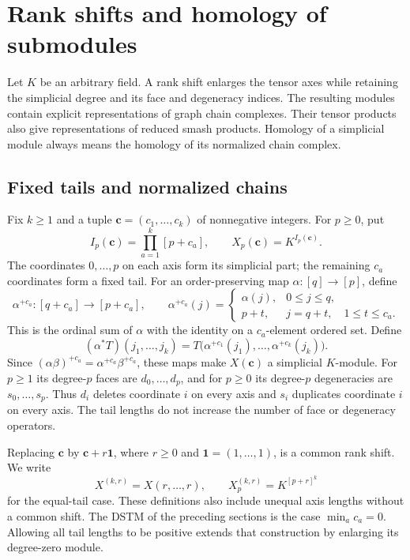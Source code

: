 \section{Rank shifts and homology of submodules}
\label{sec:rank-shifted-homology}

Let $K$ be an arbitrary field. A rank shift enlarges the tensor axes while retaining
the simplicial degree and its face and degeneracy indices. The resulting
modules contain explicit representations of graph chain complexes. Their
tensor products also give representations of reduced smash products.
Homology of a simplicial module always means the homology of its
normalized chain complex.

\subsection{Fixed tails and normalized chains}

Fix $k\geq 1$ and a tuple $\mathbf c=(c_1,\ldots,c_k)$ of nonnegative
integers. For $p\geq 0$, put
\[
 I_p(\mathbf c)=\prod_{a=1}^k[p+c_a],
 \qquad X_p(\mathbf c)=K^{I_p(\mathbf c)}.
\]
The coordinates $0,\ldots,p$ on each axis form its simplicial part; the
remaining $c_a$ coordinates form a fixed tail. For an order-preserving map
$\alpha:[q]\to[p]$, define
\[
 \alpha^{+c_a}:[q+c_a]\longrightarrow[p+c_a],\qquad
 \alpha^{+c_a}(j)=
 \begin{cases}
   \alpha(j),&0\leq j\leq q,\\
   p+t,&j=q+t,\quad 1\leq t\leq c_a.
 \end{cases}
\]
This is the ordinal sum of $\alpha$ with the identity on a $c_a$-element
ordered set. Define
\begin{equation}\label{eq:shifted-pullback}
 (\alpha^*T)(j_1,\ldots,j_k)
 =T\bigl(\alpha^{+c_1}(j_1),\ldots,
          \alpha^{+c_k}(j_k)\bigr).
\end{equation}
Since $(\alpha\beta)^{+c_a}=\alpha^{+c_a}\beta^{+c_a}$,
these maps make $X(\mathbf c)$ a simplicial $K$-module. For $p\geq1$ its
degree-$p$ faces are $d_0,\ldots,d_p$, and for $p\geq0$ its degree-$p$ degeneracies are
$s_0,\ldots,s_p$. Thus $d_i$ deletes coordinate $i$ on every axis and
$s_i$ duplicates coordinate $i$ on every axis. The tail lengths do not
increase the number of face or degeneracy operators.

Replacing $\mathbf c$ by
$\mathbf c+r\mathbf 1$, where $r\geq0$ and
$\mathbf1=(1,\ldots,1)$, is a common rank shift. We write
\[
 X^{(k,r)}=X(r,\ldots,r),\qquad
 X^{(k,r)}_p=K^{[p+r]^k}
\]
for the equal-tail case. These definitions also include unequal axis
lengths without a common shift. The DSTM of the preceding sections is
the case $\min_a c_a=0$. Allowing all tail lengths to be positive
extends that construction by enlarging its degree-zero module.


